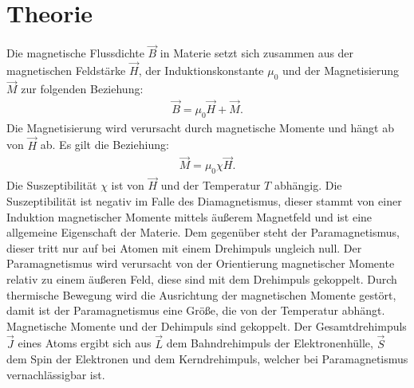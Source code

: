 \section{Theorie}
\label{sec:Theorie}
Die magnetische Flussdichte $\vec{B}$ in Materie setzt sich zusammen aus der magnetischen Feldstärke $\vec{H}$,
der Induktionskonstante $\mu_\mathrm{0}$ und der Magnetisierung $\vec{M}$ zur
folgenden Beziehung:
\begin{align}
  \vec{B}=\mu_\mathrm{0}\vec{H}+\vec{M}.
\end{align}
Die Magnetisierung wird verursacht durch magnetische Momente und hängt ab
von $\vec{H}$ ab. Es gilt die Beziehiung:
\begin{align}
  \vec{M}=\mu_\mathrm{0}\chi\vec{H}.
\end{align}
Die Suszeptibilität $\chi$ ist von $\vec{H}$ und der Temperatur $T$ abhängig.
Die Suszeptibilität ist negativ im Falle des Diamagnetismus,
dieser stammt von einer Induktion magnetischer Momente mittels äußerem
Magnetfeld und ist eine allgemeine Eigenschaft der Materie.
Dem gegenüber steht der Paramagnetismus, dieser tritt nur auf bei
Atomen mit einem Drehimpuls ungleich null. Der Paramagnetismus wird
verursacht von der Orientierung magnetischer Momente relativ
zu einem äußeren Feld, diese sind mit dem Drehimpuls gekoppelt.
Durch thermische Bewegung wird die Ausrichtung der magnetischen Momente
gestört, damit ist der Paramagnetismus eine Größe, die von der Temperatur
abhängt.
Magnetische Momente und der Dehimpuls sind gekoppelt.
Der Gesamtdrehimpuls $\vec{J}$ eines Atoms ergibt sich aus
$\vec{L}$ dem Bahndrehimpuls der Elektronenhülle, $\vec{S}$ dem Spin
der Elektronen und dem Kerndrehimpuls, welcher bei Paramagnetismus
vernachlässigbar ist.
